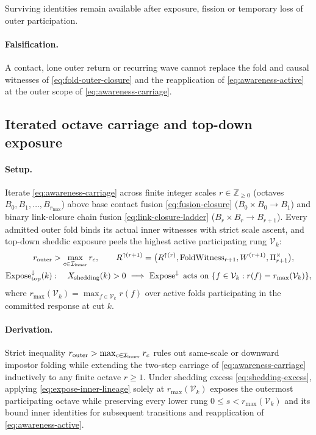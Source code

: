 Surviving identities remain available after exposure, fission
or temporary loss of outer participation.

\paragraph{Falsification.}
A contact, lone outer return or recurring wave cannot replace the fold and
causal witnesses of \eqref{eq:fold-outer-closure} and the reapplication of
\eqref{eq:awareness-active} at the outer scope of \eqref{eq:awareness-carriage}.


\subsection{Iterated octave carriage and top-down exposure}
\label{subsec:awareness-octaves}
\paragraph{Setup.}
Iterate \eqref{eq:awareness-carriage} across finite integer scales
\(r\in\mathbb Z_{\ge 0}\) (octaves \(B_0,B_1,\dots,B_{r_{\max}}\)) above
base contact fusion \eqref{eq:fusion-closure} (\(B_0\times B_0\to B_1\)) and
binary link-closure chain fusion \eqref{eq:link-closure-ladder}
(\(B_r\times B_r\to B_{r+1}\)). Every admitted outer fold binds its actual
inner witnesses with strict scale ascent, and top-down sheddic exposure peels
the highest active participating rung \(\mathcal V_k\):
\begin{equation}
 \begin{aligned}
 r_{\rm outer}&>\max_{c\in\mathcal I_{\rm inner}} r_c,\qquad
 R^{\uparrow(r+1)}=\bigl(R^{\uparrow(r)},\mathrm{FoldWitness}_{r+1},
 W^{(r+1)},\Pi^{\times}_{r+1}\bigr),\\
 \operatorname{Expose}^{\downarrow}_{\rm top}(k)&:\quad
 X_{\rm shedding}(k)>0\ \Longrightarrow\
 \operatorname{Expose}^{\downarrow}\text{ acts on }
 \{f\in\mathcal V_k:r(f)=r_{\max}(\mathcal V_k)\},
 \end{aligned}
 \label{eq:awareness-iterated-carriage}
\end{equation}
where \(r_{\max}(\mathcal V_k)=\max_{f\in\mathcal V_k}r(f)\) over active folds
participating in the committed response at cut \(k\).

\paragraph{Derivation.}
Strict inequality \(r_{\rm outer}>\max_{c\in\mathcal I_{\rm inner}}r_c\) rules
out same-scale or downward impostor folding while extending the two-step
carriage of \eqref{eq:awareness-carriage} inductively to any finite octave
\(r\ge 1\). Under shedding excess \eqref{eq:shedding-excess}, applying
\eqref{eq:expose-inner-lineage} solely at \(r_{\max}(\mathcal V_k)\) exposes
the outermost participating octave while preserving every lower rung
\(0\le s<r_{\max}(\mathcal V_k)\) and its bound inner identities for subsequent
transitions and reapplication of \eqref{eq:awareness-active}.

